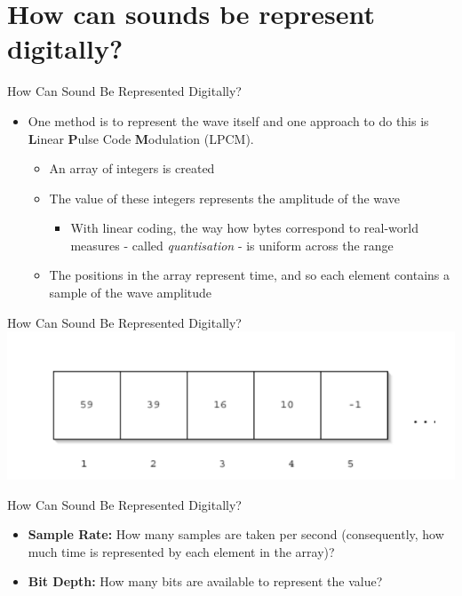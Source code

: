 \part{How can sounds be represent digitally?}
\frame{\partpage}

\begin{frame}{How Can Sound Be Represented Digitally?}
	\begin{itemize}
		\pause\item One method is to represent the wave itself and one
		approach to do this is \textbf{L}inear \textbf{P}ulse Code \textbf{M}odulation (LPCM).
		\begin{itemize}
			\pause\item An array of integers is created
			\pause\item The value of these integers represents the amplitude of the wave
			\begin{itemize}
				\pause\item  With linear coding, the way how bytes correspond to real-world
				measures - called \textit{quantisation} - is uniform across the range

			\end{itemize}
			\pause\item The positions in the array represent time, and so each element
			contains a sample of the wave amplitude 
		\end{itemize}
	\end{itemize}
\end{frame}

\begin{frame}{How Can Sound Be Represented Digitally? }
	\includegraphics[width=\linewidth,height=0.7\textheight,keepaspectratio]{pcm_array}
\end{frame}

\begin{frame}{How Can Sound Be Represented Digitally?}
	\begin{itemize}
		\pause\item\textbf{Sample Rate:} How many samples are taken per second (consequently,
		how much time is represented by each element in the
		array)?

		\pause\item\textbf{Bit Depth:} How many bits are available to represent the value?
	\end{itemize}
\end{frame}

